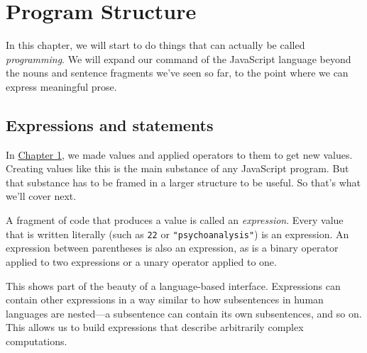 \chapter{Program Structure}\label{program_structure}


In this chapter, we will start to do things that can actually be called \emph{programming}. We will expand our command of the JavaScript language beyond the nouns and sentence fragments we've seen so far, to the point where we can express meaningful prose.

\section{Expressions and statements}

In \hyperref[values]{Chapter 1}, we made values and applied operators to them to get new values. Creating values like this is the main substance of any JavaScript program. But that substance has to be framed in a larger structure to be useful. So that's what we'll cover next.

A fragment of code that produces a value is called an \emph{expression}. Every value that is written literally (such as \lstinline`22` or \lstinline`"psychoanalysis"`) is an expression. An expression between parentheses is also an expression, as is a binary operator applied to two expressions or a unary operator applied to one.

This shows part of the beauty of a language-based interface. Expressions can contain other expressions in a way similar to how subsentences in human languages are nested—a subsentence can contain its own subsentences, and so on. This allows us to build expressions that describe arbitrarily complex computations.

